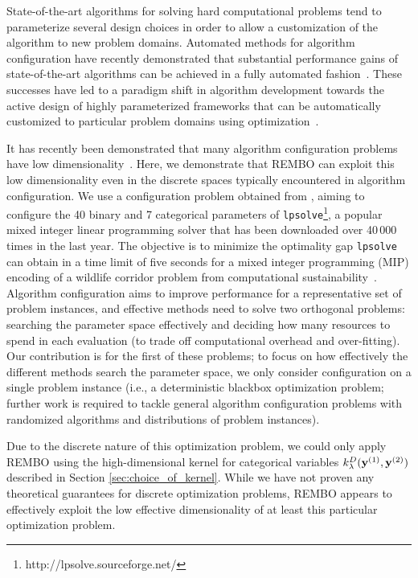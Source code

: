 \documentclass{article}
\begin{document}
State-of-the-art algorithms for solving hard computational problems tend to parameterize several design choices in order to allow a customization of the algorithm to new problem domains. Automated methods for algorithm configuration have recently demonstrated that substantial performance gains of state-of-the-art algorithms can be achieved in a fully automated fashion~\cite{Mockus:1999,Hutter:2010,ValEtAl11,Bergstra:2011,Wang:2011}. These successes have led to a paradigm shift in algorithm development towards the 
active design of highly parameterized frameworks that can be automatically customized to particular problem domains using optimization~\cite{Hoos:2012:PO:2076450.2076469,Bergstra:model_search}.

It has recently been demonstrated that many algorithm configuration problems have low dimensionality~\cite{Hutter:2013_KeyParameters}. 
Here, we demonstrate that REMBO can exploit this low dimensionality even in the discrete spaces typically encountered in algorithm configuration. 
We use a configuration problem obtained from \cite{Hutter:2010}, aiming to configure the 40 binary and 7 categorical parameters of \texttt{lpsolve}\footnote{http://lpsolve.sourceforge.net/}, a popular mixed integer linear programming solver that has been downloaded over 40\,000 times in the last year.
The objective is to minimize the optimality gap \texttt{lpsolve} can obtain in a time limit of five seconds for a mixed integer programming (MIP) encoding of a wildlife corridor problem from computational sustainability~\cite{ghs08:connection}.
Algorithm configuration aims to improve performance for a representative set of problem instances, and effective methods need to solve two orthogonal problems: searching the parameter space effectively and deciding how many resources to spend in each evaluation (to trade off computational overhead and over-fitting). Our contribution is for the first of these problems; to focus on how effectively the different methods search the parameter space, we only consider configuration on a single problem instance (i.e., a deterministic blackbox optimization problem; further work is required to tackle general algorithm configuration problems with randomized algorithms and distributions of problem instances).

Due to the discrete nature of this optimization problem, we could only apply REMBO using the high-dimensional kernel for categorical variables $k^D_{\lambda}(\mathbf{y}^{(1)}, \mathbf{y}^{(2)})$ described in Section \ref{sec:choice_of_kernel}. While we have not proven any theoretical guarantees for discrete optimization problems, REMBO appears to effectively exploit the low effective dimensionality of at least this particular optimization problem.
\end{document}

